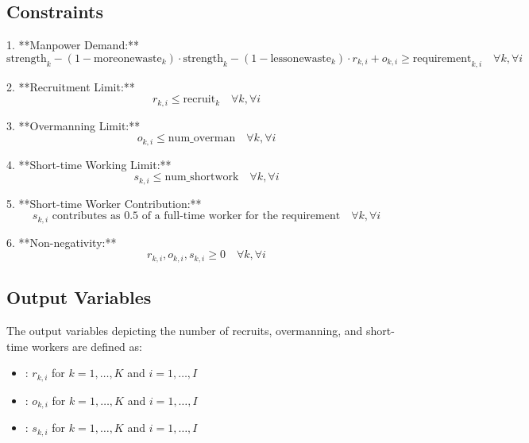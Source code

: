 \documentclass{article}
\begin{document}
\subsection*{Constraints}
1. **Manpower Demand:**
   \[
   \text{strength}_{k} - (1 - \text{moreonewaste}_{k}) \cdot \text{strength}_{k} - (1 - \text{lessonewaste}_{k}) \cdot r_{k,i} + o_{k,i} \geq \text{requirement}_{k,i} \quad \forall k, \forall i
   \]

2. **Recruitment Limit:**
   \[
   r_{k,i} \leq \text{recruit}_{k} \quad \forall k, \forall i
   \]

3. **Overmanning Limit:**
   \[
   o_{k,i} \leq \text{num\_overman} \quad \forall k, \forall i
   \]

4. **Short-time Working Limit:**
   \[
   s_{k,i} \leq \text{num\_shortwork} \quad \forall k, \forall i
   \]

5. **Short-time Worker Contribution:**
   \[
   s_{k,i} \text{ contributes as } 0.5 \text{ of a full-time worker for the requirement} \quad \forall k, \forall i
   \]

6. **Non-negativity:**
   \[
   r_{k,i}, o_{k,i}, s_{k,i} \geq 0 \quad \forall k, \forall i
   \]

\subsection*{Output Variables}
The output variables depicting the number of recruits, overmanning, and short-time workers are defined as:
\begin{itemize}
    \item {}: \( r_{k,i} \) for \( k = 1,\ldots,K \) and \( i = 1,\ldots,I \)
    \item {}: \( o_{k,i} \) for \( k = 1,\ldots,K \) and \( i = 1,\ldots,I \)
    \item {}: \( s_{k,i} \) for \( k = 1,\ldots,K \) and \( i = 1,\ldots,I \)
\end{itemize}
\end{document}
